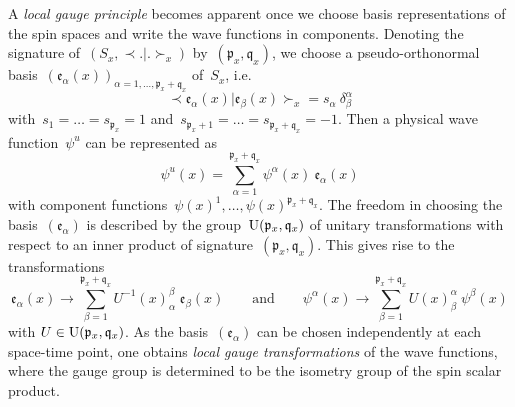 \documentclass[reqno,11pt]{amsart}
\numberwithin{equation}{section}
\newcommand{\beq}{\begin{equation}}
\newcommand{\eeq}{\end{equation}}
\newcommand{\Sl}{\mathopen{\prec}}
\newcommand{\Sr}{\mathclose{\succ}}
\newcommand{\1}{\mbox{\rm 1 \hspace{-1.05 em} 1}}
\newcommand{\p}{\mathfrak{p}}
\newcommand{\q}{\mathfrak{q}}
\newcommand{\U}{\text{\rm{U}}}
\begin{document}
A {\em{local gauge principle}} becomes apparent once we choose
basis representations of the spin spaces and write the wave functions in components.
Denoting the signature of~$(S_x, \Sl .|. \Sr_x)$ by~$(\p_x,\q_x)$, we choose
a pseudo-orthonormal basis~$(\mathfrak{e}_\alpha(x))_{\alpha=1,\ldots, \p_x+\q_x}$ of~$S_x$, i.e.
\[ \Sl \mathfrak{e}_\alpha(x) | \mathfrak{e}_\beta(x) \Sr_x = s_\alpha\: \delta^\alpha_\beta \]
with~$s_1=\ldots=s_{\p_x}=1$ and~$s_{\p_x+1}=\ldots=s_{\p_x+\q_x}=-1$.
Then a physical wave function~$\psi^u$ can be represented as
\[ \psi^u(x) = \sum_{\alpha=1}^{\p_x+\q_x} \psi^\alpha(x)\: \mathfrak{e}_\alpha(x) \]
with component functions~$\psi(x)^1, \ldots, \psi(x)^{\p_x+\q_x}$.
The freedom in choosing the basis~$(\mathfrak{e}_\alpha)$ is described by the
group~$\U(\p_x, \q_x)$ of unitary transformations with respect to an inner product of signature~$(\p_x,\q_x)$.
This gives rise to the transformations
\beq \label{gauge1}
\mathfrak{e}_\alpha(x) \rightarrow \sum_{\beta=1}^{\p_x+\q_x} U^{-1}(x)^\beta_\alpha\;
\mathfrak{e}_\beta(x) \qquad \text{and} \qquad
\psi^\alpha(x) \rightarrow  \sum_{\beta=1}^{\p_x+\q_x} U(x)^\alpha_\beta\: \psi^\beta(x)
\eeq
with $U \in \U(\p_x, \q_x)$.
As the basis~$(\mathfrak{e}_\alpha)$ can be chosen independently at each space-time point,
one obtains {\em{local gauge transformations}} of the wave functions,
where the gauge group is determined to be the isometry group of the spin scalar product.
\end{document}
